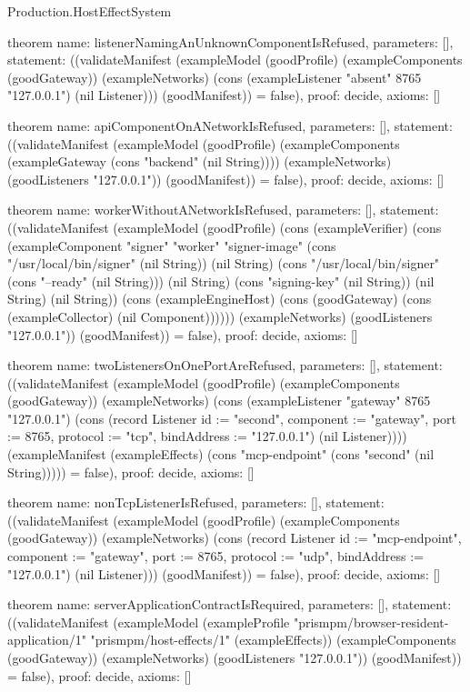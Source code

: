 \begin{lexlean}{Production.HostEffectSystem}
\begin{semanticmodule}
theorem{
  name: listenerNamingAnUnknownComponentIsRefused,
  parameters: [],
  statement: ((validateManifest (exampleModel (goodProfile) (exampleComponents (goodGateway)) (exampleNetworks) (cons (exampleListener "absent" 8765 "127.0.0.1") (nil Listener))) (goodManifest)) = false),
  proof: decide{},
  axioms: []
}

theorem{
  name: apiComponentOnANetworkIsRefused,
  parameters: [],
  statement: ((validateManifest (exampleModel (goodProfile) (exampleComponents (exampleGateway (cons "backend" (nil String)))) (exampleNetworks) (goodListeners "127.0.0.1")) (goodManifest)) = false),
  proof: decide{},
  axioms: []
}

theorem{
  name: workerWithoutANetworkIsRefused,
  parameters: [],
  statement: ((validateManifest (exampleModel (goodProfile) (cons (exampleVerifier) (cons (exampleComponent "signer" "worker" "signer-image" (cons "/usr/local/bin/signer" (nil String)) (nil String) (cons "/usr/local/bin/signer" (cons "--ready" (nil String))) (nil String) (cons "signing-key" (nil String)) (nil String) (nil String)) (cons (exampleEngineHost) (cons (goodGateway) (cons (exampleCollector) (nil Component)))))) (exampleNetworks) (goodListeners "127.0.0.1")) (goodManifest)) = false),
  proof: decide{},
  axioms: []
}

theorem{
  name: twoListenersOnOnePortAreRefused,
  parameters: [],
  statement: ((validateManifest (exampleModel (goodProfile) (exampleComponents (goodGateway)) (exampleNetworks) (cons (exampleListener "gateway" 8765 "127.0.0.1") (cons (record Listener {id := "second", component := "gateway", port := 8765, protocol := "tcp", bindAddress := "127.0.0.1"}) (nil Listener)))) (exampleManifest (exampleEffects) (cons "mcp-endpoint" (cons "second" (nil String))))) = false),
  proof: decide{},
  axioms: []
}

theorem{
  name: nonTcpListenerIsRefused,
  parameters: [],
  statement: ((validateManifest (exampleModel (goodProfile) (exampleComponents (goodGateway)) (exampleNetworks) (cons (record Listener {id := "mcp-endpoint", component := "gateway", port := 8765, protocol := "udp", bindAddress := "127.0.0.1"}) (nil Listener))) (goodManifest)) = false),
  proof: decide{},
  axioms: []
}

theorem{
  name: serverApplicationContractIsRequired,
  parameters: [],
  statement: ((validateManifest (exampleModel (exampleProfile "prismpm/browser-resident-application/1" "prismpm/host-effects/1" (exampleEffects)) (exampleComponents (goodGateway)) (exampleNetworks) (goodListeners "127.0.0.1")) (goodManifest)) = false),
  proof: decide{},
  axioms: []
}


\end{semanticmodule}
\end{lexlean}
